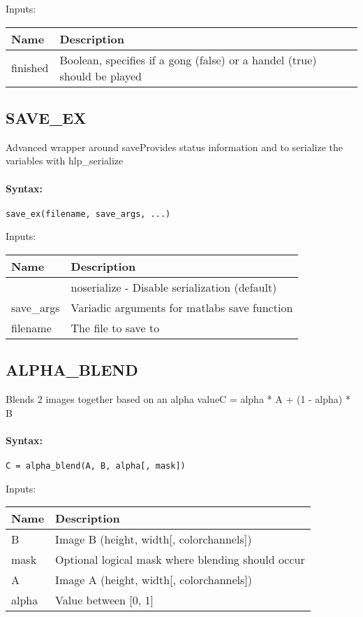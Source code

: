 \bigskip
Inputs:

\begin{tabular}{|p{}|p{}|}
\hline
\textbf{Name} & \textbf{Description} \\
\hline \hline
finished & Boolean, specifies if a gong (false) or a handel (true) should be played  \\ \hline
\end{tabular}


\subsection{SAVE\_EX}

Advanced wrapper around saveProvides status information and to serialize the variables with hlp\_serialize

\paragraph{Syntax:} \verb|save_ex(filename, save_args, ...)|

\bigskip
Inputs:

\begin{tabular}{|p{}|p{}|}
\hline
\textbf{Name} & \textbf{Description} \\
\hline \hline
 & noserialize - Disable serialization (default)  \\ \hline
save\_args & Variadic arguments for matlabs save function  \\ \hline
filename & The file to save to  \\ \hline
\end{tabular}


\subsection{ALPHA\_BLEND}

Blends 2 images together based on an alpha valueC = alpha * A + (1 - alpha) * B

\paragraph{Syntax:} \verb|C = alpha_blend(A, B, alpha[, mask])|

\bigskip
Inputs:

\begin{tabular}{|p{}|p{}|}
\hline
\textbf{Name} & \textbf{Description} \\
\hline \hline
B & Image B (height, width[, colorchannels])  \\ \hline
mask & Optional logical mask where blending should occur  \\ \hline
A & Image A (height, width[, colorchannels])  \\ \hline
alpha & Value between [0, 1]  \\ \hline
\end{tabular}


